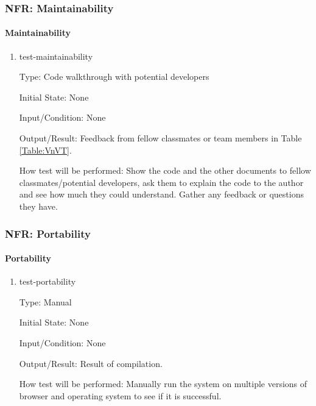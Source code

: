 \documentclass[12pt, titlepage]{article}
\begin{document}
		
\subsubsection{NFR: Maintainability}\label{t_maintainability}
		
\paragraph{Maintainability}

\begin{enumerate}

\item{test-maintainability}

Type: Code walkthrough with potential developers
					
Initial State: None
					
Input/Condition: None
					
Output/Result: Feedback from fellow classmates or team members in Table \ref{Table:VnVT}.				
	
How test will be performed: Show the code and the other documents to fellow classmates/potential developers, ask them to explain the code to the author and see how much they could understand. Gather any feedback or questions they have.
\end{enumerate}

		
\subsubsection{NFR: Portability}\label{t_portability}
		
\paragraph{Portability}

\begin{enumerate}

\item{test-portability}

Type: Manual
					
Initial State: None
					
Input/Condition: None
					
Output/Result: Result of compilation.
					
How test will be performed: Manually run the system on multiple versions of browser and operating system to see if it is successful.

\end{enumerate}
		
\end{document}
